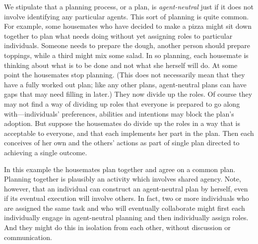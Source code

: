 \documentclass[12pt,\papersize]{extarticle}
\begin{document}

We stipulate that a planning process, or a plan, is \emph{agent-neutral} just if it does not involve identifying any particular agents.  
This sort of planning is quite common.
For example, some housemates who have decided to make a pizza might sit down together to plan what needs doing without yet assigning roles to particular individuals. 
Someone needs to prepare the dough, 
another person should prepare toppings,
while a third might mix some salad.
In so planning, each housemate is thinking about what is to be done and not what she herself will do.  
At some point the housemates stop planning.
(This does not necessarily mean that they have a fully worked out plan; like any other plans, agent-neutral plans can have gaps that may need filling in later.)
They now divide up the roles.
Of course they may not find a way of dividing up roles that everyone is prepared to go along with---individuals' preferences, abilities and intentions may block the plan's adoption.
But suppose the housemates do divide up the roles in a way that is acceptable to everyone, 
	and that each implements her part in the plan.
Then each conceives of her own and the others' actions as part of single plan directed to achieving a single outcome.

In this example
	the housemates plan together and agree on a common plan.
	Planning together is plausibly an activity which involves shared agency.
	Note, however, that an individual can construct an agent-neutral plan by herself, even if its eventual execution will involve others. 
	In fact, two or more individuals who are assigned the same task and who will eventually collaborate might first each individually engage in agent-neutral planning and then individually assign roles.
	And they might do this in isolation from each other, without discussion or communication.
\end{document}
